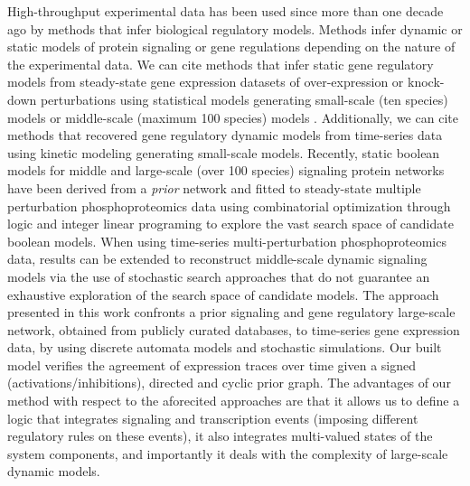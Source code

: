 High-throughput experimental data has been used since more than one decade ago by methods that infer 
biological regulatory models. 
Methods infer dynamic or static models of protein signaling or gene regulations
depending on the nature of the experimental data.
We can cite methods that infer static gene regulatory models from steady-state gene expression datasets of over-expression or knock-down perturbations  
using statistical models generating small-scale (ten species) models \cite{Gardner2003} or middle-scale (maximum 100 species) 
models \cite{Pinna2010}.
Additionally, we can cite methods that 
recovered gene regulatory dynamic models from time-series data using kinetic modeling \cite{Busch2008,Porreca2010} 
generating small-scale models.
Recently, static boolean models for middle and large-scale (over 100 species) 
signaling protein networks have been derived from a \emph{prior} network and 
fitted to steady-state multiple perturbation 
phosphoproteomics data \cite{guziolowski2013exhaustively,mitsos2009identifying} using combinatorial optimization through  
logic and integer linear programing to explore the vast search space of candidate boolean models.
When using time-series multi-perturbation phosphoproteomics data, results can be extended to reconstruct middle-scale dynamic signaling models  
via the use of stochastic search approaches \cite{macnamara2012state} that do not guarantee an exhaustive exploration of 
the search space of candidate models.
The approach presented in this work confronts a prior signaling and gene regulatory large-scale network, obtained from publicly curated databases, to 
time-series gene expression data, by using discrete automata models and stochastic simulations.
Our built model verifies the agreement of expression traces over time given
a signed (activations/inhibitions), directed and cyclic prior graph. 
The advantages of our method with respect to the aforecited approaches are that 
it allows us to define a logic that integrates signaling and transcription events (imposing different regulatory rules on these events), 
it also integrates multi-valued states of the system components, and importantly it deals with the complexity of large-scale dynamic models.


